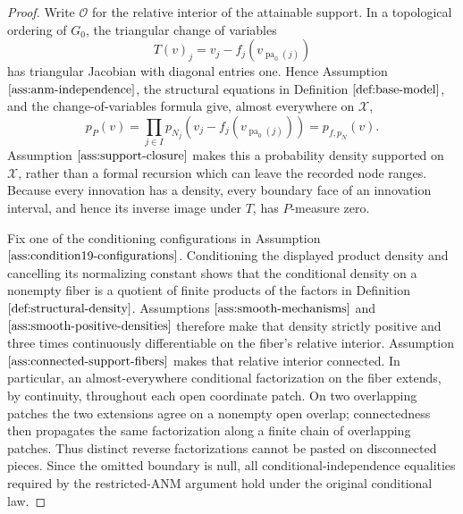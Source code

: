 \documentclass{article}
\begin{document}
\begin{proof}
Write \(\mathcal O\) for the relative interior of the attainable support.  In a topological ordering of \(G_0\), the triangular change of variables
\[
 T(v)_j=v_j-f_j(v_{\operatorname{pa}_0(j)})
\]
has triangular Jacobian with diagonal entries one.  Hence Assumption \(\ref{ass:anm-independence}\), the structural equations in Definition \(\ref{def:base-model}\), and the change-of-variables formula give, almost everywhere on \(\mathcal X\),
\[
 p_P(v)=\prod_{j\in I}p_{N_j}\!\left(v_j-f_j(v_{\operatorname{pa}_0(j)})\right)
 =p_{f,p_N}(v).
\]
Assumption \(\ref{ass:support-closure}\) makes this a probability density supported on \(\mathcal X\), rather than a formal recursion which can leave the recorded node ranges.  Because every innovation has a density, every boundary face of an innovation interval, and hence its inverse image under \(T\), has \(P\)-measure zero.

Fix one of the conditioning configurations in Assumption \(\ref{ass:condition19-configurations}\).  Conditioning the displayed product density and cancelling its normalizing constant shows that the conditional density on a nonempty fiber is a quotient of finite products of the factors in Definition \(\ref{def:structural-density}\).  Assumptions \(\ref{ass:smooth-mechanisms}\) and \(\ref{ass:smooth-positive-densities}\) therefore make that density strictly positive and three times continuously differentiable on the fiber's relative interior.  Assumption \(\ref{ass:connected-support-fibers}\) makes that relative interior connected.  In particular, an almost-everywhere conditional factorization on the fiber extends, by continuity, throughout each open coordinate patch.  On two overlapping patches the two extensions agree on a nonempty open overlap; connectedness then propagates the same factorization along a finite chain of overlapping patches.  Thus distinct reverse factorizations cannot be pasted on disconnected pieces.  Since the omitted boundary is null, all conditional-independence equalities required by the restricted-ANM argument hold under the original conditional law.


\end{proof}
\end{document}
